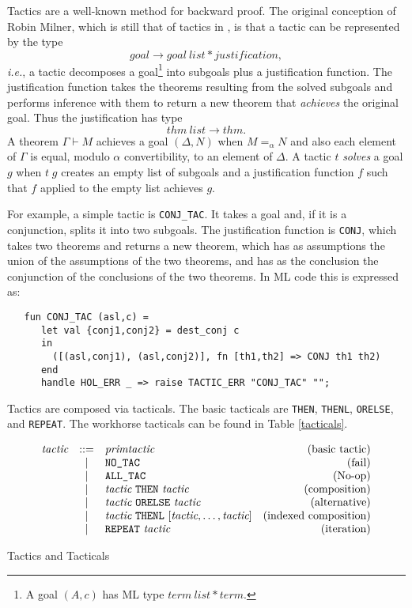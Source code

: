 \documentclass[12pt,fleqn,a4paper]{report}
\newcommand{\tactic}      {\mbox{\it tactic}}
\newcommand{\primtactic}      {\mbox{\it primtactic}}
\begin{document}
Tactics are a well-known method for backward proof. The original
conception of Robin Milner, which is still that of tactics in
\HOL, is that a tactic can be represented by the type
\[ goal \longrightarrow goal\ list * justification, \]
{\it i.e.}, a tactic decomposes a goal\footnote{A goal $(A,c)$ has ML
type $term\ list * term$.} into subgoals plus a
justification function. The justification function takes the theorems
resulting from the solved subgoals and performs inference with them to
return a new theorem that {\it achieves} the original goal. Thus the
justification has type
 \[  thm\ list \longrightarrow thm.  \]
 A theorem $\Gamma \vdash M$ achieves a goal $(\Delta,N)$ when $M =_\alpha
 N$ and also each element of $\Gamma$ is equal, modulo $\alpha$
 convertibility, to an element of $\Delta$. A tactic $t$ {\it solves\/} a
 goal $g$ when $t\; g$ creates an empty list of subgoals and a
 justification function $f$ such that $f$ applied to the empty list
 achieves $g$.

For example, a simple tactic is \verb+CONJ_TAC+. It takes a goal and, if
it is a conjunction, splits it into two subgoals. The justification
function is \verb+CONJ+, which takes two theorems and returns a new
theorem, which has as assumptions the union of the assumptions of the
two theorems, and has as the conclusion the conjunction of the
conclusions of the two theorems. In ML code this is expressed as:

\begin{verbatim}
   fun CONJ_TAC (asl,c) =
      let val {conj1,conj2} = dest_conj c
      in
        ([(asl,conj1), (asl,conj2)], fn [th1,th2] => CONJ th1 th2)
      end
      handle HOL_ERR _ => raise TACTIC_ERR "CONJ_TAC" "";
\end{verbatim}

Tactics are composed via tacticals. The basic tacticals are \verb+THEN+,
\verb+THENL+, \verb+ORELSE+, and \verb+REPEAT+. The workhorse tacticals
can be found in Table \ref{tacticals}.

\begin{table}
\[
\begin{array}{rclr}
 \tactic & ::= & \primtactic & \mbox{(basic tactic)} \\
 & | & \verb+NO_TAC+ & \mbox{(fail)} \\
 & | & \verb+ALL_TAC+ & \mbox{(No-op)} \\
 & | & \tactic\ \verb+THEN+ \ \tactic & \mbox{(composition)} \\
 & | & \tactic\ \verb+ORELSE+ \ \tactic & \mbox{(alternative)} \\
 & | & \tactic\ \verb+THENL+ \ [\tactic, \ldots, \tactic] &
\mbox{(indexed composition)} \\
 & | & \verb+REPEAT+\ \tactic & \mbox{(iteration)} \\
\end{array}
\]
\caption{Tactics and Tacticals} \label{tacticals}
\end{table}
\end{document}
